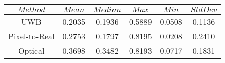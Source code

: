\begin{table}[h]
\centering
\begin{tabular}{|c|c|c|c|c|c|}
\hline
$Method$ & $Mean$ & $Median$ & $Max$ & $Min$ & $StdDev$ \\
\hline
UWB & 0.2035 & 0.1936 & 0.5889 & 0.0508 & 0.1136 \\
\hline
Pixel-to-Real & 0.2753 & 0.1797 & 0.8195 & 0.0208 & 0.2410 \\
\hline
Optical & 0.3698 & 0.3482 & 0.8193 & 0.0717 & 0.1831 \\
\hline
\end{tabular}
\end{table}
